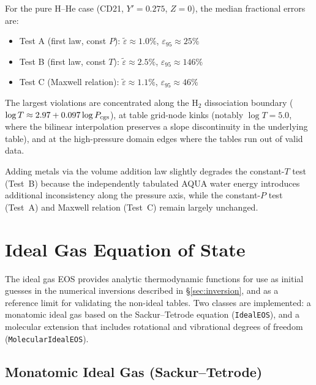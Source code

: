 \documentclass[twocolumn]{aastex701}
\begin{document}
For the pure H--He case (CD21, $Y' = 0.275$, $Z = 0$), the median fractional errors are:
\begin{itemize}
    \item Test A (first law, const $P$): $\tilde{\varepsilon} \approx 1.0\%$, $\varepsilon_{95} \approx 25\%$
    \item Test B (first law, const $T$): $\tilde{\varepsilon} \approx 2.5\%$, $\varepsilon_{95} \approx 146\%$
    \item Test C (Maxwell relation): $\tilde{\varepsilon} \approx 1.1\%$, $\varepsilon_{95} \approx 46\%$
\end{itemize}
The largest violations are concentrated along the H$_2$ dissociation boundary ($\log T \approx 2.97 + 0.097 \log P_{\rm cgs}$), at table grid-node kinks (notably $\log T = 5.0$, where the bilinear interpolation preserves a slope discontinuity in the underlying table), and at the high-pressure domain edges where the tables run out of valid data.

Adding metals via the volume addition law slightly degrades the constant-$T$ test (Test~B) because the independently tabulated AQUA water energy introduces additional inconsistency along the pressure axis, while the constant-$P$ test (Test~A) and Maxwell relation (Test~C) remain largely unchanged.

\section{Ideal Gas Equation of State}\label{sec:ideal_eos}

The ideal gas EOS provides analytic thermodynamic functions for use as initial guesses in the numerical inversions described in \S\ref{sec:inversion}, and as a reference limit for validating the non-ideal tables.
Two classes are implemented: a monatomic ideal gas based on the Sackur--Tetrode equation (\texttt{IdealEOS}), and a molecular extension that includes rotational and vibrational degrees of freedom (\texttt{MolecularIdealEOS}).

\subsection{Monatomic Ideal Gas (Sackur--Tetrode)}\label{sec:sackur_tetrode}
\end{document}
